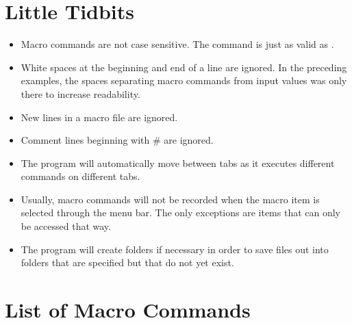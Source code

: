 \section{Little Tidbits}\label{Little Tidbits}
\begin{itemize}
    \item Macro commands are not case
    sensitive. The command  
    is just as valid as 
    . 
    \item White spaces at the beginning and end of a
    line are ignored. In the preceding examples, the
    spaces separating macro commands from input values
    was only there to increase readability. 
    \item New lines in a macro file are ignored.
    \item Comment lines beginning with \# 
    are ignored.
    \item The program will automatically move
    between tabs as it executes different commands 
    on different tabs. 
    \item Usually, macro commands will not be recorded
    when the macro item is selected through the menu bar. The
    only exceptions are items that can only be accessed
    that way.
    \item The program will create folders if necessary in
    order to save files out into folders that are specified
    but that do not yet exist.
\end{itemize}


\section{List of Macro Commands}\label{macro_commands_table}

